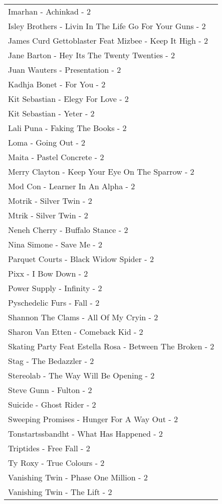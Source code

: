 \documentclass[
]{article}
\begin{document}
\begin{longtable}{l}
Imarhan - Achinkad - 2 \\ 
Isley Brothers - Livin In The Life Go For Your Guns - 2 \\ 
James Curd Gettoblaster Feat Mizbee - Keep It High - 2 \\ 
Jane Barton - Hey Its The Twenty Twenties - 2 \\ 
Juan Wauters - Presentation - 2 \\ 
Kadhja Bonet - For You - 2 \\ 
Kit Sebastian - Elegy For Love - 2 \\ 
Kit Sebastian - Yeter - 2 \\ 
Lali Puna - Faking The Books - 2 \\ 
Loma - Going Out - 2 \\ 
Maita - Pastel Concrete - 2 \\ 
Merry Clayton - Keep Your Eye On The Sparrow - 2 \\ 
Mod Con - Learner In An Alpha - 2 \\ 
Motrik - Silver Twin - 2 \\ 
Mtrik - Silver Twin - 2 \\ 
Neneh Cherry - Buffalo Stance - 2 \\ 
Nina Simone - Save Me - 2 \\ 
Parquet Courts - Black Widow Spider - 2 \\ 
Pixx - I Bow Down - 2 \\ 
Power Supply - Infinity - 2 \\ 
Pyschedelic Furs - Fall - 2 \\ 
Shannon The Clams - All Of My Cryin - 2 \\ 
Sharon Van Etten - Comeback Kid - 2 \\ 
Skating Party Feat Estella Rosa - Between The Broken - 2 \\ 
Stag - The Bedazzler - 2 \\ 
Stereolab - The Way Will Be Opening - 2 \\ 
Steve Gunn - Fulton - 2 \\ 
Suicide - Ghost Rider - 2 \\ 
Sweeping Promises - Hunger For A Way Out - 2 \\ 
Tonstartssbandht - What Has Happened - 2 \\ 
Triptides - Free Fall - 2 \\ 
Ty Roxy - True Colours - 2 \\ 
Vanishing Twin - Phase One Million - 2 \\ 
Vanishing Twin - The Lift - 2 \\ 

\end{longtable}
\end{document}
